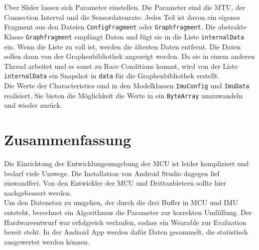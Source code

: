 Über Slider lassen sich Parameter einstellen.
Die Parameter sind die MTU, der Connection Interval und die Sensordatenrate.
Jedes Teil ist davon ein eigenes Fragment aus den Dateien \texttt{ConfigFragment} oder \texttt{Graphfragment}.
Die abstrakte Klasse \texttt{Graphfragment} empfängt Daten und fügt sie in die Liste \texttt{internalData} ein.
Wenn die Liste zu voll ist, werden die ältesten Daten entfernt.
Die Daten sollen dann von der Graphenbibliothek angezeigt werden.
Da sie in einem anderen Thread arbeitet und es sonst zu Race Conditions kommt, wird von der Liste \texttt{internalData} ein Snapshot in \texttt{data} für die Graphenbibliothek erstellt.\\
Die Werte der Characteristics sind in den Modelklassen \texttt{ImuConfig} und \texttt{ImuData} realisiert.
Sie bieten die Möglichkeit die Werte in ein \texttt{ByteArray} umzuwandeln und wieder zurück.

\section{Zusammenfassung}
Die Einrichtung der Entwicklungsumgebung der MCU ist leider kompliziert und bedarf viele Umwege.
Die Installation von Android Studio dagegen lief einwandfrei.
Von den Entwickler der MCU und Drittanbietern sollte hier nachgebessert werden.\\
Um den Datenstau zu umgehen, der durch die drei Buffer in MCU und IMU entsteht, berechnet ein Algorithmus die Parameter zur korrekten Umfüllung.
Der Hardwareentwurf war erfolgreich verlaufen, sodass ein Wearable zur Evaluation bereit steht.
In der Android App werden dafür Daten gesammelt, die statistisch ausgewertet werden können.
